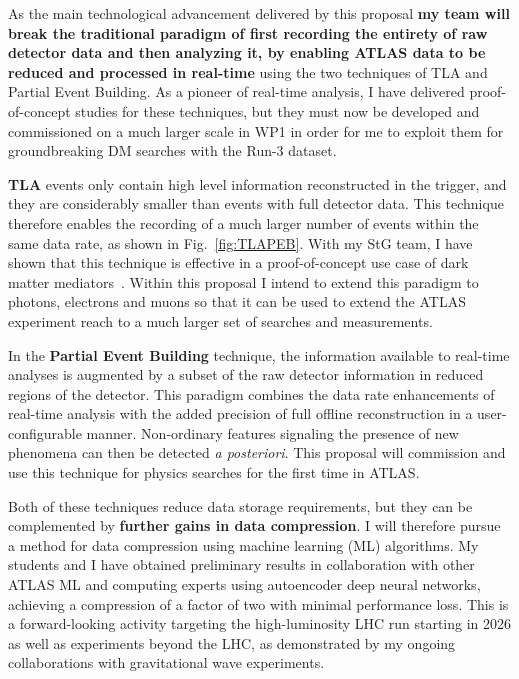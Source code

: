 \documentclass[11pt,a4paper]{article}
\begin{document}
As the main technological advancement delivered by this proposal \textbf{my team will break the traditional paradigm of first recording the entirety of raw detector data and then analyzing it, by enabling ATLAS data to be reduced and processed in real-time} using the two techniques of TLA and Partial Event Building. As a pioneer of real-time analysis, I have delivered proof-of-concept studies for these techniques, but they must now be developed and commissioned on a much larger scale in WP1 in order for me to exploit them for groundbreaking DM searches with the Run-3 dataset.

\textbf{TLA} events only contain high level information reconstructed in the trigger, and they are considerably smaller than events with full detector data. 
This technique therefore enables the recording of a much larger number of events within the same data rate, as shown in Fig.~\ref{fig:TLAPEB}.  
With my StG team, I have shown that this technique is effective in a proof-of-concept use case of dark matter mediators~\cite{Aaboud:2018fzt}. 
Within this proposal I intend to extend this paradigm to photons, electrons and muons so that it can be used to extend the ATLAS experiment reach to a much larger set of searches and measurements. 

In the \textbf{Partial Event Building} technique, the information available to real-time analyses is augmented by a subset of the raw detector information in reduced regions of the detector. This paradigm combines the data rate enhancements of real-time analysis with the added precision of full offline reconstruction in a user-configurable manner. 
Non-ordinary features signaling the presence of new phenomena can then be detected \textit{a posteriori}. 
This proposal will commission and use this technique for physics searches for the first time in ATLAS. 

Both of these techniques reduce data storage requirements, but they can be complemented by \textbf{further gains in data compression}. I will therefore pursue a method for data compression using machine learning (ML) algorithms. My students and I have obtained preliminary results in collaboration with other ATLAS ML and computing experts using autoencoder deep neural networks, achieving a compression of a factor of two with minimal performance loss. This is a forward-looking activity targeting the high-luminosity LHC run starting in 2026 as well as experiments beyond the LHC, as demonstrated by my ongoing collaborations with gravitational wave experiments.
\end{document}
